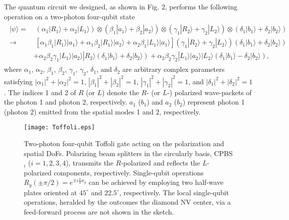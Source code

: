 \documentclass[showpacs,preprintnumbers,showkeys,amsmath,amssymb]{revtex4}%
\begin{document}
The quantum circuit we designed, as shown in Fig. 2, performs the following operation on a two-photon four-qubit state
\begin{eqnarray}       \label{eq4}
\begin{split}
|\psi\rangle=&\;(\alpha_{1}|R_1\rangle + \alpha_{2}|L_1\rangle) \otimes (\beta_{1}|a_1\rangle + \beta_{2}|a_2\rangle)
\otimes (\gamma_{1}|R_2\rangle + \gamma_{2}|L_2\rangle) \otimes (\delta_{1}|b_1\rangle + \delta_{2}|b_2\rangle)
\\ \rightarrow&\;
[\alpha_{1} \beta_{1}|R_1\rangle|a_1\rangle
+\alpha_{1} \beta_{2}|R_1\rangle |a_2\rangle
+\alpha_{2}\beta_{1}|L_1\rangle|a_1\rangle](\gamma_{1}|R_2\rangle +\gamma_{2}|L_2\rangle)(\delta_{1}|b_1\rangle + \delta_{2}|b_2\rangle)
  \\&
+\alpha_{2}\beta_{2}\gamma_{1}|L_1\rangle |a_2\rangle|R_2\rangle (\delta_{1}|b_1\rangle + \delta_{2}|b_2\rangle)+ \alpha_{2}\beta_{2}\gamma_{2}|L_1\rangle|a_2\rangle|L_2\rangle (\delta_{1}|b_1\rangle - \delta_{2}|b_2\rangle),
\end{split}
\end{eqnarray}
where $\alpha_1$, $\alpha_2$, $\beta_1$, $\beta_2$, $\gamma_1$, $\gamma_2$, $\delta_1$, and $\delta_2$ are arbitrary complex parameters satisfying  $|\alpha_1|^2+|\alpha_2|^2=1$, $|\beta_1|^2+|\beta_2|^2=1$, $|\gamma_1|^2+|\gamma_2|^2=1$, and $|\delta_1|^2+|\delta_2|^2=1$. The indices 1 and 2 of $R$ (or $L$) denote the $R$- (or $L$-) polarized wave-packets of the photon 1 and photon 2, respectively.  $a_1$ ($b_1$) and $a_2$ ($b_2$) represent photon 1 (photon 2) emitted from the spatial modes 1 and 2, respectively.



\begin{figure}%
\centering
\texttt{[image: Toffoli.eps]}
\caption{Two-photon four-qubit Toffoli gate acting on the polarization and spatial DoFs. Polarizing beam splitters in the circularly basis, CPBS$_i$ ($i=1,2,3,4$),  transmits
the $R$-polarized and reflects the $L$-polarized components, respectively. Single-qubit operations $R_y(\pm\pi/2)=e^{\mp i\frac{\pi}{4}\sigma_y}$ can be achieved by employing two half-wave plates oriented at $45^\circ$ and $22.5^\circ$, respectively. The local single-qubit operations, heralded by the outcomes the diamond NV center, via a feed-forward process are not shown in the sketch.
}
 \label{Toffoli}
\end{figure}
\end{document}
